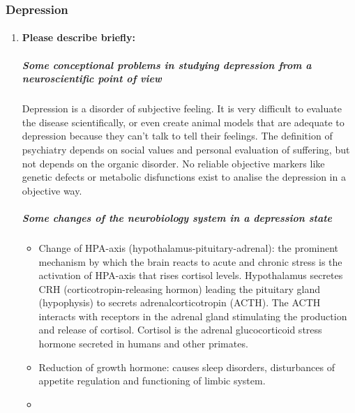 \documentclass[12pt,article,oneside,a4paper]{memoir}
\begin{document}
\subsubsection{Depression}
\begin{enumerate}
\item \paragraph{Please describe briefly:}
\subparagraph{Some conceptional problems in studying depression from a
neuroscientific point of view} 

Depression is a disorder of subjective feeling. It is very difficult to
evaluate the disease scientifically, or even create animal models that are
adequate to depression because they can't talk to tell their feelings. The
definition of psychiatry depends on social values and personal evaluation of
suffering, but not depends on the organic disorder. No reliable objective
markers like genetic defects or metabolic disfunctions exist to analise the
depression in a objective way.

\subparagraph{Some changes of the neurobiology system in a depression state}
\begin{itemize}
\item Change of HPA-axis (hypothalamus-pituitary-adrenal): the prominent
mechanism by which the brain reacts to acute and chronic stress is the
activation of HPA-axis that rises cortisol levels. Hypothalamus secretes CRH
(corticotropin-releasing hormon) leading the pituitary gland (hypophysis) to
secrets adrenalcorticotropin (ACTH). The ACTH interacts with receptors in the
adrenal gland stimulating the production and release of cortisol. Cortisol is
the adrenal glucocorticoid stress hormone secreted in humans and other
primates.
\item Reduction of growth hormone: causes sleep disorders, disturbances of
appetite regulation and functioning of limbic system.
\item 
\end{itemize}


\end{enumerate}

\end{document}
